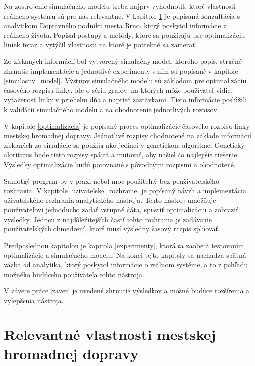 Na zostrojenie simulačného modelu treba najprv vyhodnotiť, ktoré vlastnosti reálneho systému sú pre nás relevantné.
V kapitole \ref{relevantne_vlastnosti} je popísaná konzultácia s analytikom Dopravného podniku mesta Brno, ktorý poskytol informácie z reálneho života.
Popísal postupy a metódy, ktoré sa používajú pre optimalizáciu liniek teraz a vytýčil vlastnosti na ktoré je potrebné sa zamerať. 

Zo získaných informácií bol vytvorený simulačný model, ktorého popis, stručné zhrnutie implementácie a jednotlivé experimenty s ním sú popísané v kapitole \ref{simulacny_model}.
Výstupy simulačného modelu sú základom pre optimalizáciu časového rozpisu linky.
Ide o sériu grafov, na ktorých môže používateľ vidieť vyťaženosť linky v priebehu dňa a naprieč zastávkami.
Tieto informácie poslúžili k validácii simulačného modelu a na ohodnotenie jednotlivých rozpisov.

V kapitole \ref{optimalizacia} je popísaný proces optimalizácie časového rozpisu linky mestskej hromadnej dopravy.
Jednotlivé rozpisy ohodnotené na základe informácií získaných zo simulácie sa použijú ako jedinci v genetickom algoritme.
Genetický aloritmus bude tieto rozpisy spájať a mutovať, aby našiel čo najlepšie riešenie.
Výsledky optimalizácie budú porovnané s pôvodnými rozpismi a ohodnotené.

Samotný program by v praxi nebol moc použiteľný bez používateľského rozhrania.
V kapitole \ref{uzivatelske_rozhranie} je popísaný návrh a implementácia uživateľského rozhrania analytického nástroja.
Tento nástroj umožňuje používateľovi jednoducho zadať vstupné dáta, spustiť optimalizáciu a zobraziť výsledky.
Jednou z najdôležitejších častí tohto rozhrania je zadávanie používateľských obmedzení, ktoré musí výsledny časový rozpis splňovať.

Predposlednou kapitolou je kapitola \ref{experimenty}, ktorá sa zaoberá testovaním optimalizácie a simulačného modelu.
Na konci tejto kapitoly sa nachádza spätná väzba od analytika, ktorý poskytol informácie o reálnom systéme, a to z pohľadu možného budúceho používateľa tohto nástroja.

V závere práce \ref{zaver} je uvedené zhrnutie výsledkov a možné budúce rozšírenia a vylepšenia nástroja.

\chapter{Relevantné vlastnosti mestskej hromadnej dopravy} %
\label{relevantne_vlastnosti}

